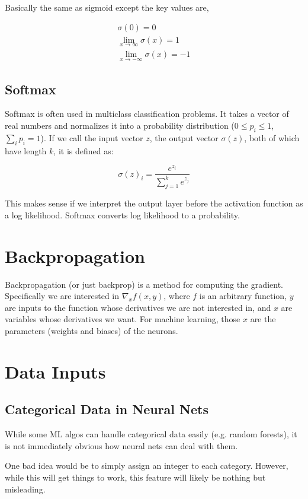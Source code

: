 \documentclass{article}
\begin{document}
Basically the same as sigmoid except the key values are,

\begin{align}
    \sigma(0) = 0 \\
    \lim_{x \to \infty} \sigma(x) = 1 \\
    \lim_{x \to -\infty} \sigma(x) = -1
\end{align}

\subsection{Softmax}

Softmax is often used in multiclass classification problems. It takes a vector of real numbers and normalizes it into a probability distribution ($0 \leq p_i \leq 1$, $\sum_{i} p_i = 1$). If we call the input vector $z$, the output vector $\sigma(z)$, both of which have length $k$, it is defined as:

$$
\sigma(z)_i = \frac{ e^{z_i} }{ \sum_{j=1}^{k} e^{z_j} }
$$

This makes sense if we interpret the output layer before the activation function as a log likelihood. Softmax converts log likelihood to a probability.


\section{Backpropagation}

Backpropagation (or just backprop) is a method for computing the gradient. Specifically we are interested in $\nabla_{x} f(x, y)$, where $f$ is an arbitrary function, $y$ are inputs to the function whose derivatives we are not interested in, and $x$ are variables whose derivatives we want.
For machine learning, those $x$ are the parameters (weights and biases) of the neurons.


\section{Data Inputs}


\subsection{Categorical Data in Neural Nets}

While some ML algos can handle categorical data easily (e.g. random forests), it is not immediately obvious how neural nets can deal with them.

One bad idea would be to simply assign an integer to each category. However, while this will get things to work, this feature will likely be nothing but misleading.
\end{document}

